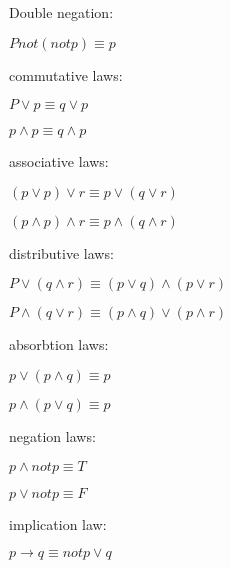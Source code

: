 \documentclass[a4paper,10pt]{article}
\begin{document}
Double negation:
\begin{description}
 \item $P not ( not p) \equiv p$
\end{description}

commutative laws:
\begin{description}
 \item $P \vee p \equiv q \vee p$
 \item $p \wedge p \equiv q \wedge p $
\end{description}

associative laws:
\begin{description}
 \item $ (p \vee p) \vee r \equiv p \vee (q \vee r)$
 \item $ (p \wedge p) \wedge r  \equiv p \wedge ( q\wedge r) $
\end{description}

distributive laws:
\begin{description}
 \item $P \vee (q \wedge r) \equiv (p \vee q) \wedge (p \vee r)$
 \item $P \wedge (q \vee r) \equiv (p \wedge q) \vee (p \wedge r)$
\end{description}
absorbtion laws:
\begin{description}
 \item $ p\vee (p\wedge q) \equiv p$
 \item $ p \wedge (p\vee q) \equiv p$
\end{description}
negation laws:
\begin{description}
 \item $ p\wedge not p\equiv T$
 \item $ p \vee not  p\equiv F$
 \end{description}
 
 implication law:
 \begin{description}
  \item $p\longrightarrow q\equiv notp\vee q$
 \end{description}
\end{document}
